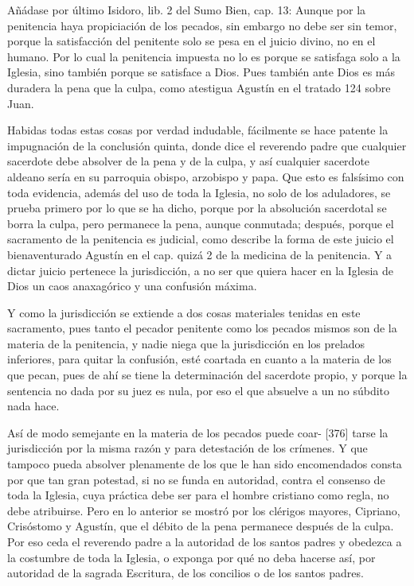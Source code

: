 Añádase por último Isidoro, lib. 2 del Sumo Bien, cap. 13: Aunque por la penitencia haya propiciación de los pecados, sin embargo no debe ser sin temor, porque la satisfacción del penitente solo se pesa en el juicio divino, no en el humano. Por lo cual la penitencia impuesta no lo es porque se satisfaga solo a la Iglesia, sino también porque se satisface a Dios. Pues también ante Dios es más duradera la pena que la culpa, como atestigua Agustín en el tratado 124 sobre Juan.

Habidas todas estas cosas por verdad indudable, fácilmente se hace patente la impugnación de la conclusión quinta, donde dice el reverendo padre que cualquier sacerdote debe absolver de la pena y de la culpa, y así cualquier sacerdote aldeano sería en su parroquia obispo, arzobispo y papa. Que esto es falsísimo con toda evidencia, además del uso de toda la Iglesia, no solo de los aduladores, se prueba primero por lo que se ha dicho, porque por la absolución sacerdotal se borra la culpa, pero permanece la pena, aunque conmutada; después, porque el sacramento de la penitencia es judicial, como describe la forma de este juicio el bienaventurado Agustín en el cap. quizá 2 de la medicina de la penitencia. Y a dictar juicio pertenece la jurisdicción, a no ser que quiera hacer en la Iglesia de Dios un caos anaxagórico y una confusión máxima.

Y como la jurisdicción se extiende a dos cosas materiales tenidas en este sacramento, pues tanto el pecador penitente como los pecados mismos son de la materia de la penitencia, y nadie niega que la jurisdicción en los prelados inferiores, para quitar la confusión, esté coartada en cuanto a la materia de los que pecan, pues de ahí se tiene la determinación del sacerdote propio, y porque la sentencia no dada por su juez es nula, por eso el que absuelve a un no súbdito nada hace.

Así de modo semejante en la materia de los pecados puede coar- [376] tarse la jurisdicción por la misma razón y para detestación de los crímenes. Y que tampoco pueda absolver plenamente de los que le han sido encomendados consta por que tan gran potestad, si no se funda en autoridad, contra el consenso de toda la Iglesia, cuya práctica debe ser para el hombre cristiano como regla, no debe atribuirse. Pero en lo anterior se mostró por los clérigos mayores, Cipriano, Crisóstomo y Agustín, que el débito de la pena permanece después de la culpa. Por eso ceda el reverendo padre a la autoridad de los santos padres y obedezca a la costumbre de toda la Iglesia, o exponga por qué no deba hacerse así, por autoridad de la sagrada Escritura, de los concilios o de los santos padres.

